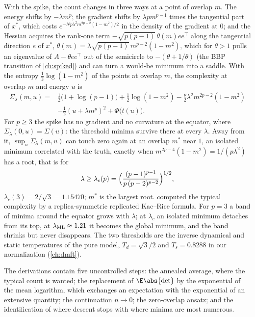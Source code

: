 \begin{refsection}
With the spike, the count changes in three ways at a point of overlap $m$. The energy shifts by $-\lambda m^p$; the gradient shifts by $\lambda pm^{p-1}$ times the tangential part of $x^*$, which costs $e^{-Np\lambda^2m^{2p-2}(1-m^2)/2}$ in the density of the gradient at $0$; and the Hessian acquires the rank-one term $-\sqrt{p(p-1)}\,\theta(m)ee^\top$ along the tangential direction $e$ of $x^*$, $\theta(m)=\lambda\sqrt{p(p-1)}\,m^{p-2}(1-m^2)$, which for $\theta>1$ pulls an eigenvalue of $A-\theta ee^\top$ out of the semicircle to $-(\theta+1/\theta)$ (the BBP transition of \cref{ch:spiked}) and can turn a would-be minimum into a saddle. With the entropy $\frac12\log(1-m^2)$ of the points at overlap $m$, the complexity at overlap $m$ and energy $u$ is
\begin{equation}\label{eq:kacrice:sigmalambda}
\begin{split}
\Sigma_\lambda(m,u)={}&\tfrac12\bigl(1+\log(p-1)\bigr)+\tfrac12\log(1-m^2)-\tfrac p2\lambda^2m^{2p-2}(1-m^2)\\
&-\tfrac12(u+\lambda m^p)^2+\Phi\bigl(t(u)\bigr).
\end{split}
\end{equation}
For $p\ge3$ the spike has no gradient and no curvature at the equator, where $\Sigma_\lambda(0,u)=\Sigma(u)$: the threshold minima survive there at every $\lambda$. Away from it, $\sup_u\Sigma_\lambda(m,u)$ can touch zero again at an overlap $m^*$ near $1$, an isolated minimum correlated with the truth, exactly when $m^{2p-4}(1-m^2)=1/(p\lambda^2)$ has a root, that is for
\begin{equation}\label{eq:kacrice:lambdac}
\lambda\ge\lambda_c(p)=\Bigl(\frac{(p-1)^{p-1}}{p\,(p-2)^{p-2}}\Bigr)^{1/2},
\end{equation}
$\lambda_c(3)=2/\sqrt3=1.15470$; $m^*$ is the largest root. \Textcite{RosEtAl2019} computed the typical complexity by a replica-symmetric replicated Kac--Rice formula. For $p=3$ a band of minima around the equator grows with $\lambda$; at $\lambda_c$ an isolated minimum detaches from its top, at $\lambda_{\mathrm{ML}}\approx1.21$ it becomes the global minimum, and the band shrinks but never disappears. The two thresholds are the inverse dynamical and static temperatures of the pure model, $T_d=\sqrt3/2$ and $T_s=0.8288$ in our normalization (\cref{ch:dmft}).

The derivations contain five uncontrolled steps: the annealed average, where the typical count is wanted; the replacement of $\E\abs{\det}$ by the exponential of the mean logarithm, which exchanges an expectation with the exponential of an extensive quantity; the continuation $n\to0$; the zero-overlap ansatz; and the identification of where descent stops with where minima are most numerous.


\end{refsection}
